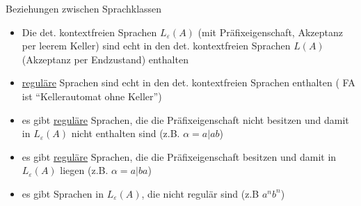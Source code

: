 \begin{frame}{Beziehungen zwischen Sprachklassen}
	\begin{itemize}
		\item Die det. kontextfreien Sprachen $L_\varepsilon(A)$ (mit Präfixeigenschaft, Akzeptanz per leerem Keller) sind echt in den det. kontextfreien Sprachen $L(A)$ (Akzeptanz per Endzustand) enthalten
		\item \underline{reguläre} Sprachen sind echt in den det. kontextfreien	Sprachen enthalten ( FA ist "`Kellerautomat ohne Keller"')
		\item es gibt \underline{reguläre} Sprachen, die die Präfixeigenschaft nicht besitzen und damit in $L_\varepsilon(A)$ nicht enthalten sind (z.B. $\alpha=a|ab$)
		\item es gibt \underline{reguläre} Sprachen, die die Präfixeigenschaft besitzen und damit in $L_\varepsilon(A)$ liegen (z.B. $\alpha=a|ba$)
		\item es gibt Sprachen in $L_\varepsilon(A)$, die nicht regulär sind (z.B ${a^nb^n}$)
	\end{itemize}
\end{frame}